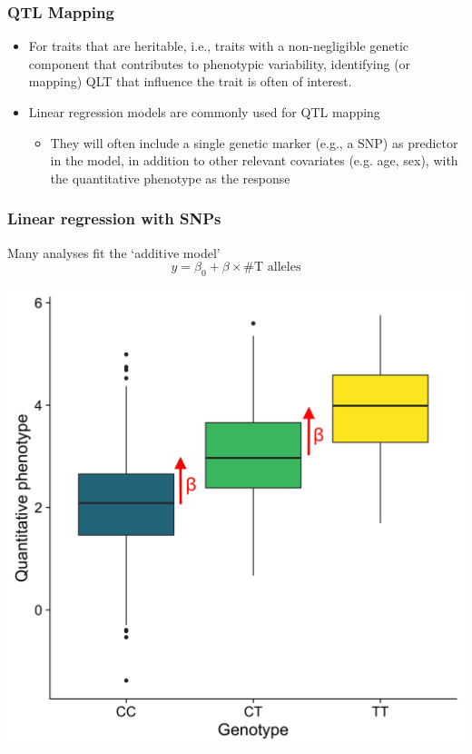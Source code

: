 \documentclass{beamer}
\begin{document}
\begin{frame}
	\frametitle{\bf  QTL Mapping}
	\begin{itemize}
		\item For traits that are heritable, i.e., traits with a non-negligible genetic component that contributes to phenotypic variability, identifying (or mapping) QLT  that influence the trait is often of interest.
		\item Linear regression models are commonly used for QTL mapping

		\begin{itemize}
		\item They will often include a single genetic marker (e.g., a SNP) as predictor in the model, in addition to other relevant covariates (e.g. age, sex), with the quantitative phenotype as the response
	\end{itemize}

\end{itemize}
\end{frame}


\begin{frame}
	\frametitle{\bf Linear regression with SNPs}
	
	Many analyses fit the `additive model'
	\[
	y = \beta_0 + \beta\times\#\mbox{T alleles}
	\]
	
	\centerline{
		\includegraphics[scale=.08]{Figures/lm_add.png}
	}
	
\end{frame}
\end{document}
